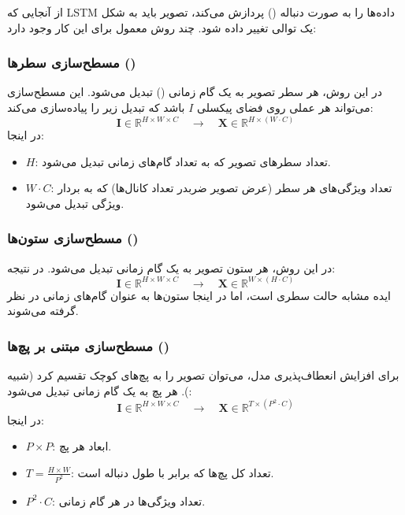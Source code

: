 از آنجایی که LSTM داده‌ها را به صورت دنباله‌ () پردازش می‌کند، تصویر باید به شکل یک توالی تغییر داده شود. چند روش معمول برای این کار وجود دارد:

\subsubsection{مسطح‌سازی سطرها ()}

در این روش، هر سطر تصویر به یک گام زمانی () تبدیل می‌شود. این مسطح‌سازی می‌تواند هر عملی روی فضای پیکسلی $I$ باشد که تبدیل زیر را پیاده‌سازی می‌کند:
\[
\mathbf{I} \in \mathbb{R}^{H \times W \times C} \quad \rightarrow \quad \mathbf{X} \in \mathbb{R}^{H \times (W \cdot C)}
\]
در اینجا:
\begin{itemize}
	\item \(H\): تعداد سطرهای تصویر که به تعداد گام‌های زمانی تبدیل می‌شود.
	\item \(W \cdot C\): تعداد ویژگی‌های هر سطر (عرض تصویر ضربدر تعداد کانال‌ها) که به بردار ویژگی تبدیل می‌شود.
\end{itemize}

\subsubsection{مسطح‌سازی ستون‌ها ()}

در این روش، هر ستون تصویر به یک گام زمانی تبدیل می‌شود. در نتیجه:
\[
\mathbf{I} \in \mathbb{R}^{H \times W \times C} \quad \rightarrow \quad \mathbf{X} \in \mathbb{R}^{W \times (H \cdot C)}
\]
ایده مشابه حالت سطری است، اما در اینجا ستون‌ها به عنوان گام‌های زمانی در نظر گرفته می‌شوند.

\subsubsection{مسطح‌سازی مبتنی بر پچ‌ها ()}

برای افزایش انعطاف‌پذیری مدل، می‌توان تصویر را به پچ‌های کوچک تقسیم کرد (شبیه
\cite{dosovitskiyImageWorth16x162021}
). هر پچ به یک گام زمانی تبدیل می‌شود:
\[
\mathbf{I} \in \mathbb{R}^{H \times W \times C} \quad \rightarrow \quad \mathbf{X} \in \mathbb{R}^{T \times (P^2 \cdot C)}
\]
در اینجا:
\begin{itemize}
	\item \(P \times P\): ابعاد هر پچ.
	\item \(T = \frac{H \times W}{P^2}\): تعداد کل پچ‌ها که برابر با طول دنباله  است.
	\item \(P^2 \cdot C\): تعداد ویژگی‌ها در هر گام زمانی.
\end{itemize}

